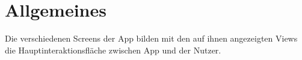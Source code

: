 \section{Allgemeines}

Die verschiedenen Screens der App bilden mit den auf ihnen angezeigten Views die 
Hauptinteraktionsfläche zwischen App und der Nutzer.